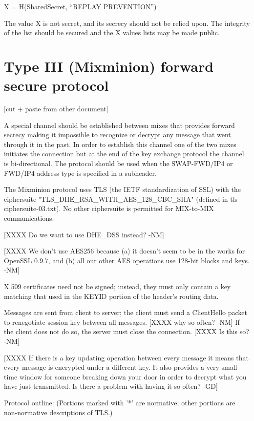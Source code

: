 X = H(SharedSecret, ``REPLAY PREVENTION'')

The value X is not secret, and its secrecy should not be relied upon.
The integrity of the list should be secured and the X values lists may
be made public.

\section{Type III (Mixminion) forward secure protocol}

[cut + paste from other document]

A special channel should be established between mixes that provides
forward secrecy making it impossible to recognize or decrypt any
message that went through it in the past. In order to establish this
channel one of the two mixes initiates the connection but at the end
of the key exchange protocol the channel is bi-directional. The
protocol should be used when the SWAP-FWD/IP4 or FWD/IP4 address type
is specified in a subheader.

The Mixminion protocol uses TLS (the IETF standardization of SSL) with
the ciphersuite "TLS_DHE_RSA_WITH_AES_128_CBC_SHA" (defined in
tls-ciphersuite-03.txt).  No other ciphersuite is permitted for
MIX-to-MIX communications.

  [XXXX Do we want to use DHE_DSS instead? -NM]

  [XXXX We don't use AES256 because (a) it doesn't seem to be in
        the works for OpenSSL 0.9.7, and (b) all our other AES
        operations use 128-bit blocks and keys. -NM]

X.509 certificates need not be signed; instead, they must only contain
a key matching that used in the KEYID portion of the header's routing
data.  

Messages are sent from client to server; the client must send a
ClientHello packet to renegotiate session key between all
messages. [XXXX why so often? -NM] If the client does not do so, the
server must close the connection.  [XXXX Is this so? -NM]

[XXXX If there is a key updating operation between every message it means
that every message is encrypted under a different key. It also
provides a very small time window for someone breaking down your door
in order to decrypt what you have just transmitted. Is there a problem
with having it so often? -GD]

Protocol outline: (Portions marked with '*' are normative; other
portions are non-normative descriptions of TLS.)

